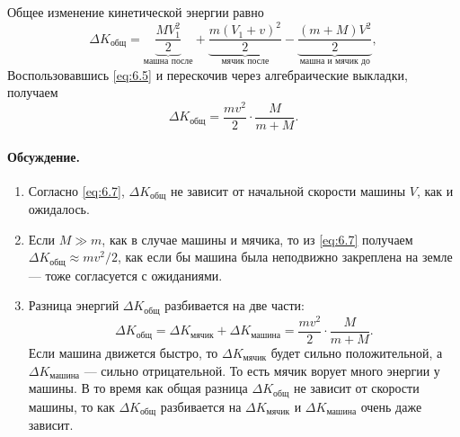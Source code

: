 Общее изменение кинетической энергии равно
\begin{equation}
\Delta K_{\text{общ}}
=
\underbrace{\frac{MV_1^{2}}{2}}_{\text{машна после}}
+
\underbrace{\frac{m(V_1+v)^{2}}{2}}_{\text{мячик после}}
-
\underbrace{\frac{(m+M)V^{2}}{2}}_{\text{машна и мячик до}},
\label{eq:6.6}
\end{equation}
Воспользовавшись \eqref{eq:6.5} и перескочив через алгебраические выкладки, получаем
\begin{equation}
\Delta K_{\text{общ}} = \frac{m v^{2}}2\cdot\frac M{m+M}.
\label{eq:6.7}
\end{equation}

\paragraph{Обсуждение.}
\begin{enumerate}
\item Согласно \eqref{eq:6.7}, $\Delta K_{\text{общ}}$ не зависит от начальной скорости машины $V$, как и ожидалось.

\item Если $M \gg m$, как в случае машины и мячика, то из \eqref{eq:6.7} получаем
$\Delta K_{\text{общ}} \approx  m v^2/2$,
как если бы машина была неподвижно закреплена на земле — тоже согласуется с ожиданиями.

\item Разница энергий $\Delta K_{\text{общ}}$ разбивается на две части:
\[
\Delta K_{\text{общ}} = \Delta K_{\text{мячик}} + \Delta K_{\text{машина}}
= \frac{m v^{2}}2\cdot\frac M{m+M}.
\]
Если машина движется быстро, то $\Delta K_{\text{мячик}}$ будет сильно положительной,
а $\Delta K_{\text{машина}}$ — сильно отрицательной.
То есть мячик ворует много энергии у машины.
В то время как общая разница $\Delta K_{\text{общ}}$ не зависит от скорости машины,
то как $\Delta K_{\text{общ}}$ разбивается на $\Delta K_{\text{мячик}}$ и $\Delta K_{\text{машина}}$ очень даже зависит.
\end{enumerate}
\label{end:Мячик из машины}
